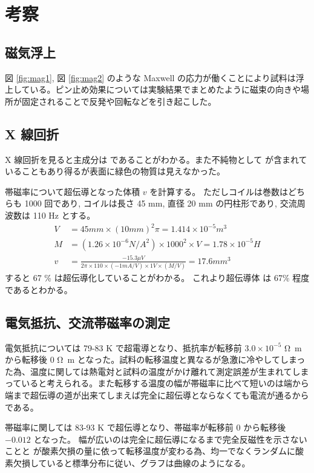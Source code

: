 \documentclass[uplatex,dvipdfmx,a4paper,11pt]{jlreq}
\numberwithin{equation}{section}
\theoremstyle{definition}
\begin{document}
\section{考察}
\subsection{磁気浮上}
図 \ref{fig:mag1}, 図 \ref{fig:mag2} のような Maxwell の応力が働くことにより試料は浮上している。ピン止め効果については実験結果でまとめたように磁束の向きや場所が固定されることで反発や回転などを引き起こした。


\subsection{X 線回折}
X 線回折を見ると主成分は  であることがわかる。また不純物として  が含まれていることもあり得るが表面に緑色の物質は見えなかった。

帯磁率について超伝導となった体積 $v$ を計算する。
ただしコイルは巻数はどちらも 1000 回であり, コイルは長さ 45 \si{mm}, 直径 20 \si{mm} の円柱形であり, 交流周波数は 110 \si{Hz} とする。
\begin{align}
  V & = 45\si{mm} \times (10\si{mm})^2\pi = 1.414 \times 10^{-5} \si{m^3}                                      \\
  M & = (1.26\times 10^{-6}\si{N/A^2})\times 1000^2 \times V = 1.78\times 10^{-5} \si{H}                       \\
  v & = \frac{-15.3\si{\mu V}}{2\pi \times 110\times (-1\si{mA/V})\times 1\si{V} \times (M/V)} = 17.6\si{mm^3}
\end{align}
すると 67 \% は超伝導化していることがわかる。
これより超伝導体  は 67\% 程度であるとわかる。



\subsection{電気抵抗、交流帯磁率の測定}
電気抵抗については 79-83 \si{K} で超電導となり、抵抗率が転移前 $3.0\times 10^{-5}$ \si{\ohm m} から転移後 0 \si{\ohm m} となった。試料の転移温度と異なるが急激に冷やしてしまった為、温度に関しては熱電対と試料の温度がかけ離れて測定誤差が生まれてしまっていると考えられる。また転移する温度の幅が帯磁率に比べて短いのは端から端まで超伝導の道が出来てしまえば完全に超伝導とならなくても電流が通るからである。

帯磁率に関しては 83-93 \si{K} で超伝導となり、帯磁率が転移前 0 から転移後 $-0.012$ となった。
幅が広いのは完全に超伝導になるまで完全反磁性を示さないことと  が酸素欠損の量に依って転移温度が変わる為、均一でなくランダムに酸素欠損していると標準分布に従い、グラフは曲線のようになる。
\end{document}
